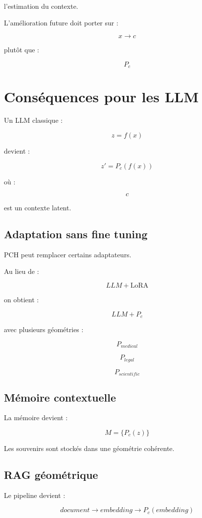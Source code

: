 \documentclass[11pt]{article}
\begin{document}
l'estimation du contexte.


L'amélioration future doit porter sur :

\[
x\rightarrow c
\]

plutôt que :

\[
P_c
\]


\section{Conséquences pour les LLM}


Un LLM classique :

\[
z=f(x)
\]


devient :

\[
z'=P_c(f(x))
\]


où :

\[
c
\]

est un contexte latent.


\subsection{Adaptation sans fine tuning}


PCH peut remplacer certains adaptateurs.


Au lieu de :

\[
LLM+\mathrm{LoRA}
\]


on obtient :

\[
LLM+P_c
\]


avec plusieurs géométries :

\[
P_{medical}
\]

\[
P_{legal}
\]

\[
P_{scientific}
\]


\subsection{Mémoire contextuelle}


La mémoire devient :

\[
M=
\{P_c(z)\}
\]


Les souvenirs sont stockés
dans une géométrie cohérente.


\subsection{RAG géométrique}


Le pipeline devient :

\[
document
\rightarrow embedding
\rightarrow P_c(embedding)
\]
\end{document}
